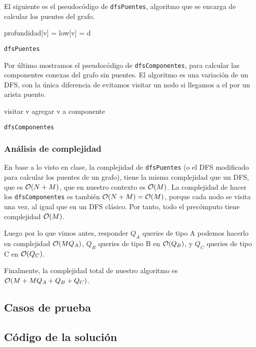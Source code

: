 El siguiente es el pseudocódigo de \texttt{dfsPuentes}, algoritmo que se encarga de calcular 
los puentes del grafo. 

\begin{algorithm}[H]
profundidad[v] = low[v] = d\;
\caption{\texttt{dfsPuentes}}
\end{algorithm}

Por último mostramos el pseudocódigo de \texttt{dfsComponentes}, para calcular 
las componentes conexas del grafo sin puentes. El algoritmo es una variación 
de un DFS, con la única diferencia de evitamos visitar un nodo si llegamos a el 
por un arista puente. 

\begin{algorithm}[H]
visitar v\;
agregar v a componente\;
\caption{\texttt{dfsComponentes}}
\end{algorithm}

\subsubsection*{Análisis de complejidad}

En base a lo visto en clase, la complejidad de \texttt{dfsPuentes} 
(o el DFS modificado para calcular los puentes de un grafo), tiene 
la misma complejidad que un DFS, que es $\mathcal{O}(N + M)$, que en nuestro contexto 
es $\mathcal{O}(M)$. La complejidad de hacer los \texttt{dfsComponentes} es también $\mathcal{O}(N + M) = \mathcal{O}(M)$, 
porque cada nodo se visita una vez, al igual que en un DFS clásico. Por tanto, 
todo el precómputo tiene complejidad $\mathcal{O}(M)$. 

Luego por lo que vimos antes, responder $Q_A$ queries de tipo A podemos 
hacerlo en complejidad $\mathcal{O}(MQ_A)$, $Q_B$ queries de tipo B en $\mathcal{O}(Q_B)$, y $Q_C$ 
queries de tipo C en $\mathcal{O}(Q_C)$. 

Finalmente, la complejidad total de nuestro algoritmo 
es $\mathcal{O}(M + MQ_A + Q_B + Q_C)$. 

\subsection{Casos de prueba}


\newpage
\subsection{Código de la solución}

